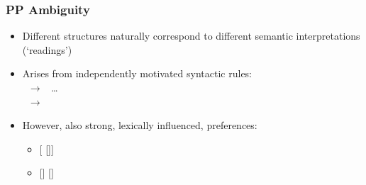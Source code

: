 % 

\begin{frame}[fragile]
  \frametitle{PP Ambiguity}

  \begin{itemize}
    \item Different structures naturally correspond to different
      semantic interpretations (`readings')
    \item Arises from independently motivated syntactic rules:\\
      \VP\ $\rightarrow$ \V\ \ldots \PP\\
      \Nom\ $\rightarrow$ \Nom\ \PP\\
    \item However, also strong, lexically influenced, preferences:
      \begin{itemize}
        \item {} [ []]
        \item {} [] []
      \end{itemize}
  \end{itemize}

\end{frame}

% 






